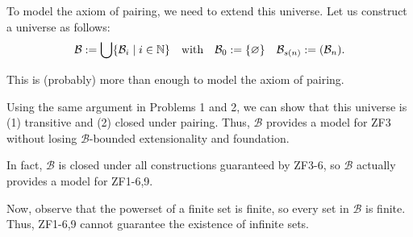 \documentclass[a4paper]{article}
\newcommand{\N}{\mathbb{N}}
\let\P\relax
\newcommand{\P}{\mathcal{P}}
\newcommand{\B}{\mathcal{B}}
\begin{document}
To model the axiom of pairing, we need to extend this universe.
Let us construct a universe as follows:
\begin{align*}
  \B := \bigcup\{\B_{i} \mid i \in \N\} && \text{with} && \B_{0} := \{\varnothing\} && \B_{s(n)} := \P(\B_{n}).
\end{align*}

This is (probably) more than enough to model the axiom of pairing.

Using the same argument in Problems 1 and 2, we can show that this universe is (1) transitive and (2) closed under pairing.
Thus, $\B$ provides a model for ZF3 without losing $\B$-bounded extensionality and foundation.

In fact, $\B$ is closed under all constructions guaranteed by ZF3-6, so $\B$ actually provides a model for ZF1-6,9.

Now, observe that the powerset of a finite set is finite, so every set in $\B$ is finite.
Thus, ZF1-6,9 cannot guarantee the existence of infinite sets.

\end{document}
